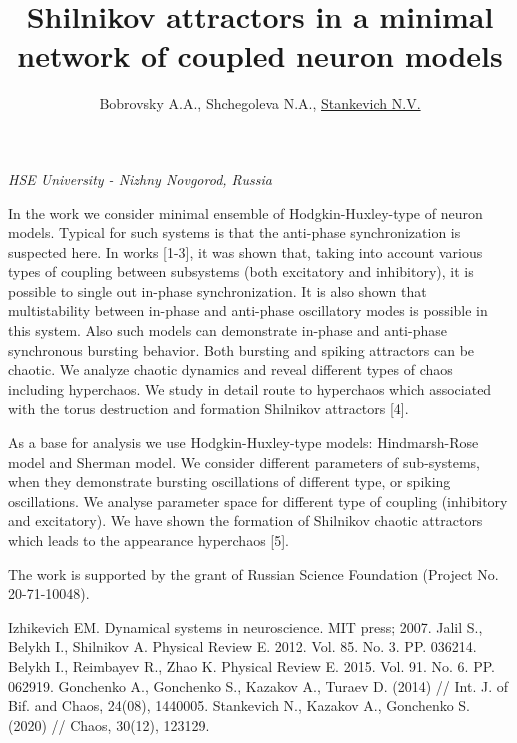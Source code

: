 \documentclass[12pt]{article}
\begin{document}
	
	\title{\bf\Large Shilnikov attractors in a minimal network of coupled neuron models}
	\author{Bobrovsky A.A., Shchegoleva N.A., \underline{Stankevich N.V.}}
	\date{}
	
	
\begin{center}
	\maketitle
	{\large\textit{HSE University - Nizhny Novgorod, Russia}}
\end{center}

In the work we consider minimal ensemble of Hodgkin-Huxley-type of neuron models. Typical for such systems is that the anti-phase synchronization is suspected here. In works [1-3], it was shown that, taking into account various types of coupling between subsystems (both excitatory and inhibitory), it is possible to single out in-phase synchronization. It is also shown that multistability between in-phase and anti-phase oscillatory modes is possible in this system. Also such models can demonstrate in-phase and anti-phase synchronous bursting behavior. Both bursting and spiking attractors can be chaotic. We analyze chaotic dynamics and reveal different types of chaos including hyperchaos. We study in detail route to hyperchaos which associated with the torus destruction and formation Shilnikov attractors [4]. 

As a base for analysis we use Hodgkin-Huxley-type models: Hindmarsh-Rose model and Sherman model. We consider different parameters of sub-systems, when they demonstrate bursting oscillations of different type, or spiking oscillations. We analyse parameter space for different type of coupling (inhibitory and excitatory). We have shown the formation of Shilnikov chaotic attractors which leads to the appearance hyperchaos [5].

The work is supported by the grant of Russian Science Foundation (Project No. 20-71-10048).

\begin{thebibliography}{99}
     Izhikevich EM. Dynamical systems in neuroscience. MIT press; 2007.
     Jalil S., Belykh I., Shilnikov A. Physical Review E. 2012. Vol. 85. No. 3. PP. 036214.
	 Belykh I., Reimbayev R., Zhao K. Physical Review E. 2015. Vol. 91. No. 6. PP. 062919.
	 Gonchenko A., Gonchenko S., Kazakov A., Turaev D. (2014) // Int. J. of Bif. and Chaos, 24(08), 1440005.
	 Stankevich N., Kazakov A., Gonchenko S. (2020) // Chaos, 30(12), 123129.
	
\end{thebibliography}
\end{document}
